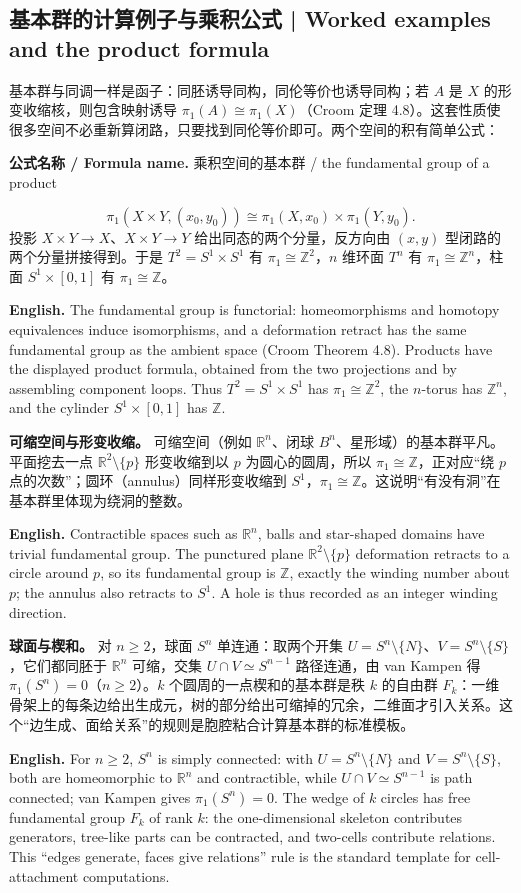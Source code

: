 \documentclass[UTF8,11pt,a4paper]{ctexart}
\newcommand{\EN}[1]{\par\noindent\textbf{English.} #1\par}
\newcommand{\FORMULA}[2]{\par\noindent\textbf{公式名称 / Formula name.} #1 / #2\par}
\begin{document}
\subsection{基本群的计算例子与乘积公式 | Worked examples and the product formula}
\noindent 基本群与同调一样是函子：同胚诱导同构，同伦等价也诱导同构；若 $A$ 是 $X$ 的形变收缩核，则包含映射诱导 $\pi_1(A)\cong\pi_1(X)$（Croom 定理 4.8）。这套性质使很多空间不必重新算闭路，只要找到同伦等价即可。两个空间的积有简单公式：
\FORMULA{乘积空间的基本群}{the fundamental group of a product}
\[
\pi_1(X\times Y,(x_0,y_0))\cong\pi_1(X,x_0)\times\pi_1(Y,y_0).
\]
投影 $X\times Y\to X$、$X\times Y\to Y$ 给出同态的两个分量，反方向由 $(x,y)$ 型闭路的两个分量拼接得到。于是 $T^2=S^1\times S^1$ 有 $\pi_1\cong\mathbb Z^2$，$n$ 维环面 $T^n$ 有 $\pi_1\cong\mathbb Z^n$，柱面 $S^1\times[0,1]$ 有 $\pi_1\cong\mathbb Z$。
\EN{The fundamental group is functorial: homeomorphisms and homotopy equivalences induce isomorphisms, and a deformation retract has the same fundamental group as the ambient space (Croom Theorem 4.8). Products have the displayed product formula, obtained from the two projections and by assembling component loops. Thus $T^2=S^1\times S^1$ has $\pi_1\cong\mathbb Z^2$, the $n$-torus has $\mathbb Z^n$, and the cylinder $S^1\times[0,1]$ has $\mathbb Z$.}

\noindent\textbf{可缩空间与形变收缩。} 可缩空间（例如 $\mathbb R^n$、闭球 $B^n$、星形域）的基本群平凡。平面挖去一点 $\mathbb R^2\setminus\{p\}$ 形变收缩到以 $p$ 为圆心的圆周，所以 $\pi_1\cong\mathbb Z$，正对应“绕 $p$ 点的次数”；圆环（annulus）同样形变收缩到 $S^1$，$\pi_1\cong\mathbb Z$。这说明“有没有洞”在基本群里体现为绕洞的整数。
\EN{Contractible spaces such as $\mathbb R^n$, balls and star-shaped domains have trivial fundamental group. The punctured plane $\mathbb R^2\setminus\{p\}$ deformation retracts to a circle around $p$, so its fundamental group is $\mathbb Z$, exactly the winding number about $p$; the annulus also retracts to $S^1$. A hole is thus recorded as an integer winding direction.}

\noindent\textbf{球面与楔和。} 对 $n\ge2$，球面 $S^n$ 单连通：取两个开集 $U=S^n\setminus\{N\}$、$V=S^n\setminus\{S\}$，它们都同胚于 $\mathbb R^n$ 可缩，交集 $U\cap V\simeq S^{n-1}$ 路径连通，由 van Kampen 得 $\pi_1(S^n)=0$（$n\ge2$）。$k$ 个圆周的一点楔和的基本群是秩 $k$ 的自由群 $F_k$：一维骨架上的每条边给出生成元，树的部分给出可缩掉的冗余，二维面才引入关系。这个“边生成、面给关系”的规则是胞腔粘合计算基本群的标准模板。
\EN{For $n\ge2$, $S^n$ is simply connected: with $U=S^n\setminus\{N\}$ and $V=S^n\setminus\{S\}$, both are homeomorphic to $\mathbb R^n$ and contractible, while $U\cap V\simeq S^{n-1}$ is path connected; van Kampen gives $\pi_1(S^n)=0$. The wedge of $k$ circles has free fundamental group $F_k$ of rank $k$: the one-dimensional skeleton contributes generators, tree-like parts can be contracted, and two-cells contribute relations. This “edges generate, faces give relations” rule is the standard template for cell-attachment computations.}
\end{document}
